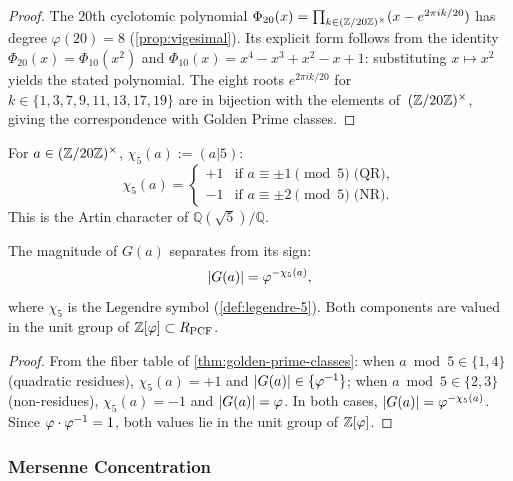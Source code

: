 \begin{proof}
The $20$th cyclotomic polynomial $\Phi_{20}(x) = \prod_{k\in(\mathbb{Z}/20\mathbb{Z})^\times}
(x - e^{2\pi ik/20})$ has degree $\varphi(20)=8$
(\cref{prop:vigesimal}).  Its explicit form follows from the
identity $\Phi_{20}(x) = \Phi_{10}(x^2)$ and $\Phi_{10}(x) = x^4 - x^3
+ x^2 - x + 1$: substituting $x\mapsto x^2$ yields the stated
polynomial.  The eight roots $e^{2\pi ik/20}$ for
$k\in\{1,3,7,9,11,13,17,19\}$ are in bijection with the elements
of~$(\mathbb{Z}/20\mathbb{Z})^\times$, giving the correspondence with Golden Prime classes.
\end{proof}

\begin{Definition}\label{def:legendre-5}
For $a\in(\mathbb{Z}/20\mathbb{Z})^\times$, $\chi_5(a) := (a|5)$:
\begin{equation}\label{eq:legendre-5}
  \chi_5(a) = \begin{cases}
    +1 & \text{if } a\equiv\pm 1\pmod{5}\;\text{(QR)}, \\
    -1 & \text{if } a\equiv\pm 2\pmod{5}\;\text{(NR)}.
  \end{cases}
\end{equation}
This is the Artin character of $\mathbb{Q}(\sqrt{5})/\mathbb{Q}$.
\end{Definition}

\begin{Proposition}\label{prop:artin-golden}
The magnitude of $G(a)$ separates from its sign:
\begin{equation}\label{eq:artin-golden}
  |G(a)| = \varphi^{-\chi_5(a)},
\end{equation}
where $\chi_5$ is the Legendre symbol (\cref{def:legendre-5}).
Both components are valued in the unit group of
$\mathbb{Z}[\varphi]\subset R_{\mathrm{PCF}}$.
\end{Proposition}

\begin{proof}
From the fiber table of \cref{thm:golden-prime-classes}:
when $a\bmod 5\in\{1,4\}$ (quadratic residues), $\chi_5(a)=+1$ and
$|G(a)|\in\{\varphi^{-1}\}$;
when $a\bmod 5\in\{2,3\}$ (non-residues), $\chi_5(a)=-1$ and
$|G(a)|=\varphi$.
In both cases, $|G(a)|=\varphi^{-\chi_5(a)}$.  Since
$\varphi\cdot\varphi^{-1}=1$, both values lie in the unit group of
$\mathbb{Z}[\varphi]$.
\end{proof}

\subsubsection{Mersenne Concentration}

